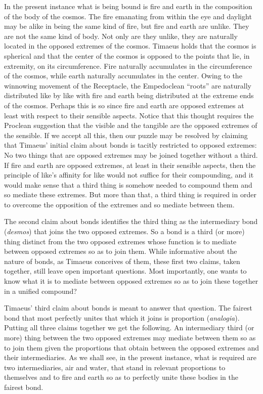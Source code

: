 In the present instance what is being bound is fire and earth in the composition of the body of the cosmos. The fire emanating from within the eye and daylight may be alike in being the same kind of fire, but fire and earth are unlike. They are not the same kind of body. Not only are they unlike, they are naturally located in the opposed extremes of the cosmos. Timaeus holds that the cosmos is spherical and that the center of the cosmos is opposed to the points that lie, in extremity, on its circumference. Fire naturally accumulates in the circumference of the cosmos, while earth naturally accumulates in the center. Owing to the winnowing movement of the Receptacle, the Empedoclean ``roots'' are naturally distributed like by like with fire and earth being distributed at the extreme ends of the cosmos. Perhaps this is so since fire and earth are opposed extremes at least with respect to their sensible aspects. Notice that this thought requires the Proclean suggestion that the visible and the tangible are the opposed extremes of the sensible. If we accept all this, then our puzzle may be resolved by claiming that Timaeus' initial claim about bonds is tacitly restricted to opposed extremes: No two things that are opposed extremes may be joined together without a third. If fire and earth are opposed extremes, at least in their sensible aspects, then the principle of like's affinity for like would not suffice for their compounding, and it would make sense that a third thing is somehow needed to compound them and so mediate these extremes. But more than that, a third thing is required in order to overcome the opposition of the extremes and so mediate between them.

The second claim about bonds identifies the third thing as the intermediary bond (\emph{desmos}) that joins the two opposed extremes. So a bond is a third (or more) thing distinct from the two opposed extremes whose function is to mediate between opposed extremes so as to join them. While informative about the nature of bonds, as Timaeus conceives of them, these first two claims, taken together, still leave open important questions. Most importantly, one wants to know what it is to mediate between opposed extremes so as to join these together in a unified compound? 

Timaeus' third claim about bonds is meant to answer that question. The fairest bond that most perfectly unites that which it joins is proportion (\emph{analogia}). Putting all three claims together we get the following. An intermediary third (or more) thing between the two opposed extremes may mediate between them so as to join them given the proportions that obtain between the opposed extremes and their intermediaries. As we shall see, in the present instance, what is required are two intermediaries, air and water, that stand in relevant proportions to themselves and to fire and earth so as to perfectly unite these bodies in the fairest bond.

